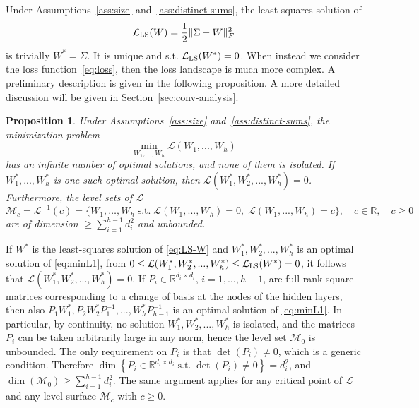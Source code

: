 \documentclass{article}
\makeatletter
\renewenvironment{proof}[1][\proofname]{
  \par\pushQED{\qed}\normalfont
  \topsep6\p@\@plus6\p@\relax
  \trivlist\item[\hskip\labelsep\bfseries#1\@addpunct{.}]
  \ignorespaces
}{
  \popQED\endtrivlist\@endpefalse
}
\newtheorem{proposition}{Proposition}
\newcommand{\1}{\mathds{1}}
\newcommand{\beq}{\begin{equation}}
\newcommand{\eeq}{\end{equation}}
\makeatother
\begin{document}
Under Assumptions~\ref{ass:size} and~\ref{ass:distinct-sums}, the least-squares solution of 
\beq
\mathcal{L}_{\rm LS} (W) = \frac{1}{2} \| \Sigma - W \|_F^2 
\label{eq:LS-W}
\eeq
is trivially $ W^\ast = \Sigma $. It is unique and s.t. $ \mathcal{L}_{\rm LS} (W^\ast ) =0$. 
When instead we consider the loss function~\eqref{eq:loss}, then the loss landscape is much more complex. A preliminary description is given in the following proposition.
A more detailed discussion will be given in Section~\ref{sec:conv-analysis}.

\begin{proposition}
\label{prop:LevelSurf}
Under Assumptions~\ref{ass:size} and~\ref{ass:distinct-sums}, the minimization problem 
\begin{equation}
\label{eq:minL1}
    \min_{W_1, \ldots, W_h } \mathcal{L}(W_1,...,W_h) 
\end{equation}
has an infinite number of optimal solutions, and none of them is isolated.
If $W_1^\ast ,...,W_h^\ast $ is one such optimal solution, then $\mathcal{L}(W_1^\ast ,W_2^\ast ,...,W_h^\ast)= 0$. 
Furthermore, the level sets of $ \mathcal{L}$ 
\[
\mathcal{M}_c = \mathcal{L}^{-1}(c) = \{ W_1, \ldots, W_h  \; \text{s.t.} \; \dot{\mathcal{L}}(W_1,...,W_h) =0, \; \mathcal{L}(W_1,...,W_h) = c \} , \quad c \in \mathbb{R}, \quad c\geq 0 
\]
are of dimension $ \geq \sum_{i=1}^{h-1} d_i^2 $ and unbounded. 
\end{proposition}
\begin{proof}
If $ W^\ast $ is the least-squares solution of \eqref{eq:LS-W} and $ W_1^\ast ,W_2^\ast ,...,W_h^\ast $ is an optimal solution of \eqref{eq:minL1}, from $ 0 \leq \mathcal{L}(W_1^\ast ,W_2^\ast ,...,W_h^\ast) \leq \mathcal{L}_{\rm LS} (W^\ast ) =0$, it follows that $\mathcal{L}(W_1^\ast ,W_2^\ast ,...,W_h^\ast)=0 $. If $ P_i \in \mathbb{R}^{d_i \times d_i } $, $i=1,\ldots, h-1$, are full rank square matrices corresponding to a change of basis at the nodes of the hidden layers, then also $ P_1 W_1^\ast ,P_2 W_2^\ast P_1^{-1} ,...,W_h^\ast P_{h-1}^{-1} $ is an optimal solution of \eqref{eq:minL1}. In particular, by continuity, no solution $ W_1^\ast ,W_2^\ast ,...,W_h^\ast $ is isolated, and the matrices $ P_i $ can be taken arbitrarily large in any norm, hence the level set $ \mathcal{M}_0 $ is unbounded. 
The only requirement on $ P_i $ is that $ \det (P_i) \neq 0$, which is a generic condition. Therefore $ \dim \left\{ P_i \in \mathbb{R}^{d_i \times d_i } \; \text{s.t.} \; \det (P_i)\neq 0 \right\} = d_i^2$, and $ \dim \left( \mathcal{M}_0 \right) \geq  \sum_{i=1}^{h-1} d_i^2$.
The same argument applies for any critical point of $ \mathcal{L}$ and any level surface $ \mathcal{M}_c $ with $ c\geq 0$.
\end{proof}
\end{document}
